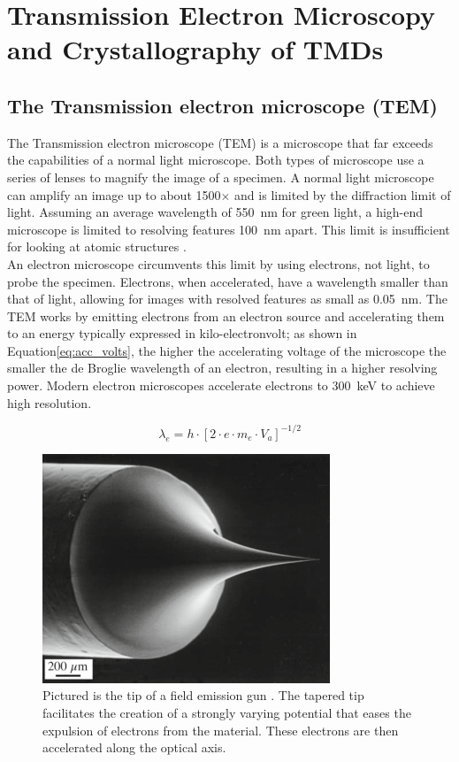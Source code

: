 \chapter{Transmission Electron Microscopy and Crystallography of TMDs}
\label{sec:theory}

\section{The Transmission electron microscope (TEM)}
The Transmission electron microscope (TEM) is a microscope that far exceeds the capabilities of a normal light microscope. Both types of microscope use a series of lenses to magnify the image of a specimen.
A normal light microscope can amplify an image up to about 1500$\times$ and is limited by the diffraction limit of light. Assuming an average wavelength of \SI{550}{\nm} for green light, a high-end microscope is limited to resolving features \SI{100}{\nm} apart.
This limit is insufficient for looking at atomic structures \cite{PhysRevLett.106.193905}.\\
An electron microscope circumvents this limit by using electrons, not light, to probe the specimen. Electrons, when accelerated, have a wavelength smaller than that of light, allowing for images with resolved features as small as \SI{0.05}{\nm}. \cite{kisielowski_freitag_bischoff_van}
The TEM works by emitting electrons from an electron source and accelerating them to an energy typically expressed in kilo-electronvolt; as shown in Equation\ref{eq:acc_volts}, the higher the accelerating voltage of the microscope the smaller the de Broglie wavelength of an electron, resulting in a higher resolving power. Modern electron microscopes accelerate electrons to \SI{300}{\kilo \electronvolt} to achieve high resolution.

\begin{equation}
    \lambda_e = h\cdot \left[ 2 \cdot e \cdot m_e \cdot V_a \right]^{-1/2}
    \label{eq:acc_volts}
\end{equation}

\begin{figure}
    \centering
    \includegraphics[keepaspectratio, width=0.5\linewidth]{resources/Figures/feg.png} 
    \caption{Pictured is the tip of a field emission gun \cite{Williams2009-ww}. The tapered tip facilitates the creation of a strongly varying potential that eases the expulsion of electrons from the material. These electrons are then accelerated along the optical axis.}
    \label{fig:feg}
\end{figure}

